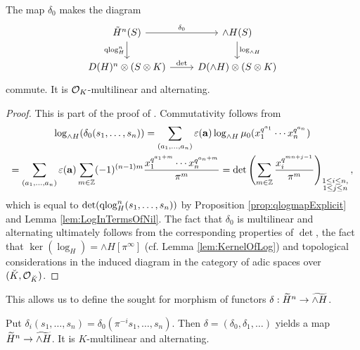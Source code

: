 \documentclass[../main.tex]{subfiles}
\begin{document}
\begin{prop}
  The map $\delta_0$ makes the diagram 
  \begin{equation*}
    \begin{tikzcd}[ampersand replacement=\&]
    	{\tilde H^n(S)} \& {\wedge H(S)} \\
    	{D(H)^n \otimes (S \otimes K)} \& {D(\wedge H) \otimes(S \otimes K)}
    	\arrow["{\delta_0}", from=1-1, to=1-2]
    	\arrow["{\qlog_H^n}"', from=1-1, to=2-1]
    	\arrow["{\log_{\wedge H}}", from=1-2, to=2-2]
    	\arrow["\det", from=2-1, to=2-2]
    \end{tikzcd}
  \end{equation*}
  commute. It is $\cO_K$-multilinear and alternating.
\begin{proof}
  This is part of the proof of \cite[Theorem
  2.10.3]{BoyarchenkoWeinstein2011MaxVar}.
  Commutativity follows from 
  \begin{multline*}
    \log_{\wedge H}(\delta_0(s_1, \dots, s_n)) = \sum_{(a_1, \dots, a_n)} 
    \varepsilon(\mathbf a) \log_{\wedge H} \mu_0( x_1^{q^{a_1}}\cdots x_n^{q^{a_n}})
     \\ = \sum_{(a_1, \dots, a_n)} \varepsilon(\mathbf a) \sum_{m \in \Z} (-1)^{(n-1)m}
    \frac{x_1^{q^{a_1+m}} \cdots x_n^{q^{a_n+m}}}{\pi^m} 
    = \det \left( \sum_{m \in \Z} \frac{x_i^{q^{mn + j-1}}}{\pi^m} \right)_{\substack{
      1 \leq i \leq n,\\
      1 \leq j \leq n}},
  \end{multline*}
  which is equal to $\det(\qlog_H^n(s_1, \dots, s_n))$ by Proposition 
  \ref{prop:qlogmapExplicit} and Lemma \ref{lem:LogInTermsOfNil}. 
  The fact that $\delta_0$ is multilinear and alternating ultimately follows
  from the corresponding properties of $\det$, the fact that $\ker(\log_H) =
  \wedge H[\pi^\infty]$ (cf. Lemma \ref{lem:KernelOfLog}) and topological considerations
  in the induced diagram in the category of adic spaces over $(\breve K, \cO_{\breve K})$.
\end{proof}
\end{prop}

This allows us to define the sought for morphism of functors
$\delta: \Tilde H^n \to \Tilde {\wedge H}$. 
\begin{defi}\label{def:DeltaMap}
  Put $\delta_i(s_1, \dots, s_n) = \delta_0(\pi^{-i} s_1, \dots, s_n)$. Then 
  $\delta = (\delta_0, \delta_1, \dots)$ yields a map 
  $\Tilde H^n \to \Tilde{\wedge H}$. It is $K$-multilinear and alternating.
\end{defi}
\end{document}
